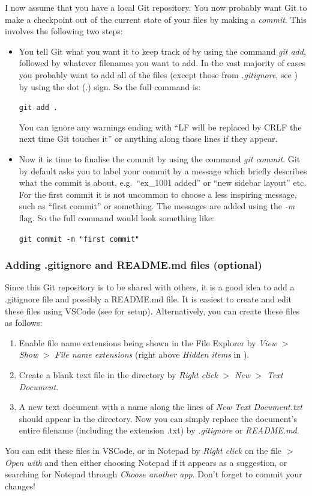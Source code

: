 \documentclass[a4paper,10pt]{article}
\begin{document}
I now assume that you have a local Git repository. You now probably want Git to make a checkpoint out of the current state of your files by making a \emph{commit}. This involves the following two steps:
\begin{itemize}
    \item You tell Git what you want it to keep track of by using the command \emph{git add}, followed by whatever filenames you want to add. In the vast majority of cases you probably want to add all of the files (except those from \emph{.gitignore}, see ) by using the dot (.) sign. So the full command is:

    \texttt{git add .}

    You can ignore any warnings ending with ``LF will be replaced by CRLF the next time Git touches it'' or anything along those lines if they appear.

    \item Now it is time to finalise the commit by using the command \emph{git commit}. Git by default asks you to label your commit by a message which briefly describes what the commit is about, e.g.\ ``ex\_1001 added'' or ``new sidebar layout'' etc. For the first commit it is not uncommon to choose a less inspiring message, such as ``first commit'' or something. The messages are added using the \emph{-m} flag. So the full command would look something like:

    \texttt{git commit -m "first commit"}    
    
\end{itemize}


\subsubsection{Adding .gitignore and README.md files (optional)}
\label{gitignore}

Since this Git repository is to be shared with others, it is a good idea to add a .gitignore file and possibly a README.md file. It is easiest to create and edit these files using VSCode (see  for setup). Alternatively, you can create these files as follows:
\begin{enumerate}
    \item Enable file name extensions being shown in the File Explorer by \emph{View} $>$ \emph{Show} $>$ \emph{File name extensions} (right above \emph{Hidden items} in ).
    \item Create a blank text file in the directory by \emph{Right click} $>$ \emph{New} $>$ \emph{Text Document}.
    \item A new text document with a name along the lines of \emph{New Text Document.txt} should appear in the directory. Now you can simply replace the document's entire filename (including the extension .txt) by \emph{.gitignore} or \emph{README.md}.
\end{enumerate}
You can edit these files in VSCode, or in Notepad by \emph{Right click} on the file $>$ \emph{Open with} and then either choosing Notepad if it appears as a suggestion, or searching for Notepad through \emph{Choose another app}. Don't forget to commit your changes!
\end{document}

